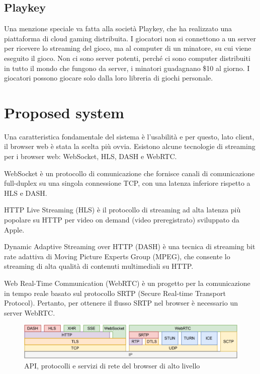 \subsection{Playkey}
Una menzione speciale va fatta alla società Playkey, che ha realizzato una piattaforma di cloud gaming distribuita. I giocatori non si connettono a un server per ricevere lo streaming del gioco, ma al computer di un minatore, su cui viene eseguito il gioco. Non ci sono server potenti, perché ci sono computer distribuiti in tutto il mondo che fungono da server, i minatori guadagnano \$10 al giorno. I giocatori possono giocare solo dalla loro libreria di giochi personale\cite{Playkey}.

\section{Proposed system}
Una caratteristica fondamentale del sistema è l'usabilità e per questo, lato client, il browser web è stata la scelta più ovvia.
Esistono alcune tecnologie di streaming per i browser web: WebSocket, HLS, DASH e WebRTC\cite{Audio_and_video_delivery}.

WebSocket è un protocollo di comunicazione che fornisce canali di comunicazione full-duplex su una singola connessione TCP, con una latenza inferiore rispetto a HLS e DASH.

HTTP Live Streaming (HLS) è il protocollo di streaming ad alta latenza più popolare su HTTP per video on demand (video preregistrato) sviluppato da Apple.

Dynamic Adaptive Streaming over HTTP (DASH) è una tecnica di streaming bit rate adattiva di Moving Picture Experts Group (MPEG), che consente lo streaming di alta qualità di contenuti multimediali su HTTP.

Web Real-Time Communication (WebRTC) è un progetto per la comunicazione in tempo reale basato sul protocollo SRTP (Secure Real-time Transport Protocol). Pertanto, per ottenere il flusso SRTP nel browser è necessario un server WebRTC\cite{High_Performance_Browser_Networking}.

\begin{figure}[H]
	\includegraphics[width=\linewidth]{immagini/webprotocols}
	\caption{API, protocolli e servizi di rete del browser di alto livello}
	\label{fig:webprotocols}
\end{figure}

